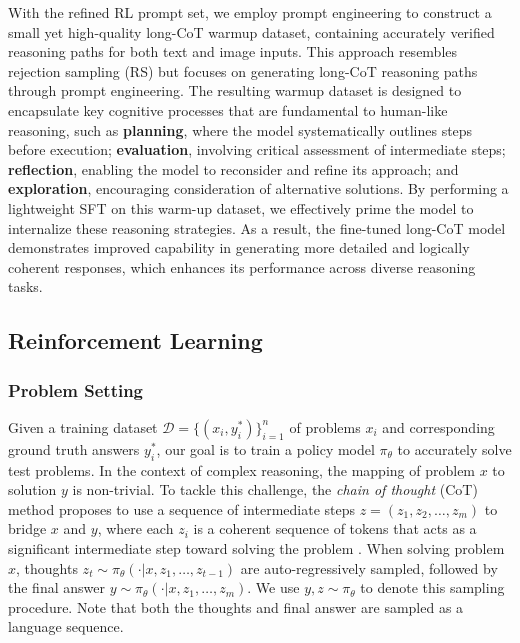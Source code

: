 \documentclass{article}
\newcommand{\citep}[1]{\parencite{#1}}
\begin{document}
With the refined RL prompt set, we employ prompt engineering to construct a small yet high-quality long-CoT warmup dataset, containing accurately verified reasoning paths for both text and image inputs. 
This approach resembles rejection sampling (RS) but focuses on generating long-CoT reasoning paths through prompt engineering. 
The resulting warmup dataset is designed to encapsulate key cognitive processes that are fundamental to human-like reasoning, such as \textbf{planning}, where the model systematically outlines steps before execution; \textbf{evaluation}, involving critical assessment of intermediate steps; \textbf{reflection}, enabling the model to reconsider and refine its approach; and \textbf{exploration}, encouraging consideration of alternative solutions.
By performing a lightweight SFT on this warm-up dataset, we effectively prime the model to internalize these reasoning strategies. As a result, the fine-tuned long-CoT model demonstrates improved capability in generating more detailed and logically coherent responses, which enhances its performance across diverse reasoning tasks.

\subsection{Reinforcement Learning} 
\label{sec:reinforcement_learning}
\subsubsection{Problem Setting}

Given a training dataset $\mathcal{D} =\{(x_i, y^*_i)\}_{i=1}^n$ of problems $x_i$ and corresponding ground truth answers $y^*_i$, our goal is to train a policy model $\pi_\theta$ to accurately solve test problems.  
In the context of complex reasoning, the mapping of problem $x$ to solution $y$ is non-trivial. 
To tackle this challenge, the \emph{chain of thought} (CoT) method proposes to use a sequence of intermediate  steps $z = (z_1, z_2, \dots, z_m)$ to bridge $x$ and $y$, where each $z_i$ is a coherent sequence of  tokens that acts as a significant intermediate step toward solving the problem \citep{wei2022chain}. 
When solving problem $x$, 
 thoughts $z_t\sim \pi_\theta(\cdot | x, z_1,\dots, z_{t-1})$ are auto-regressively sampled, followed by the final answer $y\sim \pi_\theta(\cdot | x, z_1,\dots, z_{m})$. 
We use $y, z\sim \pi_\theta$ to denote this sampling procedure.  Note that both the thoughts and final answer are sampled as a language sequence. 
\end{document}
